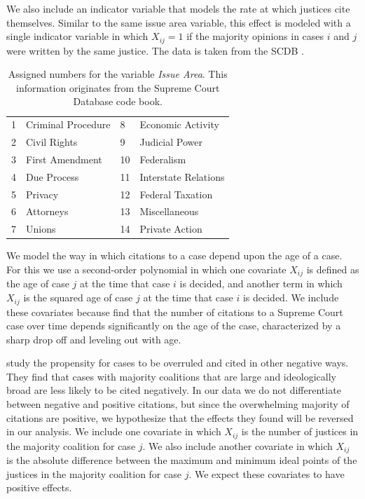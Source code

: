 \documentclass{cup-pan}
\begin{document}
We also include an indicator variable that models the rate at which justices cite themselves. Similar to the same issue area variable, this effect is modeled with a single indicator variable in which $X_{ij} = 1$ if the majority opinions in cases $i$ and $j$ were written by the same justice. The data is taken from the SCDB \citep{spaeth2014supreme}. 


\begin{table}[bt]
\caption{Assigned numbers for the variable \textit{Issue Area}. This information originates from the Supreme Court Database code book.}
\label{issue_area_coding}
\centering
\begin{tabular}{llll}
1 & Criminal Procedure & 8  & Economic Activity    \\
2 & Civil Rights       & 9  & Judicial Power       \\
3 & First Amendment    & 10 & Federalism           \\
4 & Due Process        & 11 & Interstate Relations \\
5 & Privacy            & 12 & Federal Taxation     \\
6 & Attorneys          & 13 & Miscellaneous        \\
7 & Unions             & 14 & Private Action      
\end{tabular}
\end{table}

We model the way in which citations to a case depend upon the age of a case. For this we use a second-order polynomial in which one covariate $X_{ij}$ is defined as the age of case $j$ at the time that case $i$ is decided, and another term in which $X_{ij}$ is the squared age of case $j$ at the time that case $i$ is decided. We include these covariates because \citet{black2013citation} find that the number of citations to a Supreme Court case over time depends significantly on the age of the case, characterized by a sharp drop off and leveling out with age. 

\citet{benjamin2012standing} study the propensity for cases to be overruled and cited in other negative ways. They find that cases with majority coalitions that are large and ideologically broad are less likely to be cited negatively. In our data we do not differentiate between negative and positive citations, but since the overwhelming majority of citations are positive, we hypothesize that the effects they found will be reversed in our analysis. We include one covariate in which $X_{ij}$ is the number of justices in the majority coalition for case $j$. We also include another covariate in which $X_{ij}$ is the absolute difference between the maximum and minimum ideal points of the justices in the majority coalition for case $j$. We expect these covariates to have positive effects.
\end{document}
